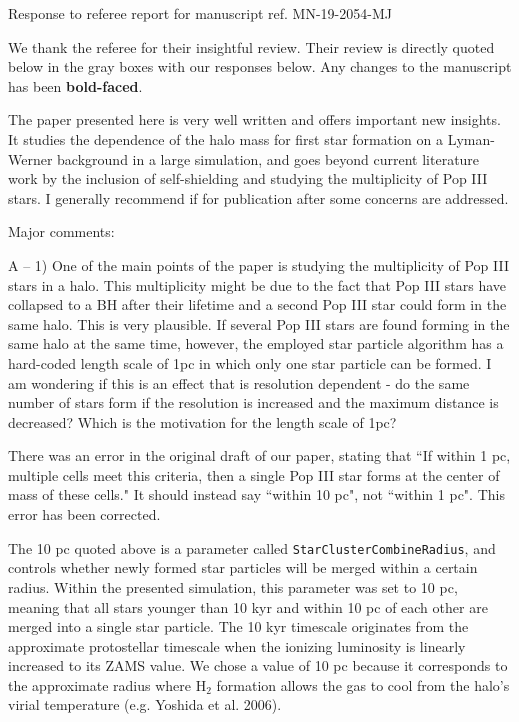 \documentclass[11pt]{article}
\newenvironment{referee}[1][]{%
    \ignorespaces%
    \begin{mdframed}[style=myquotestyle,#1]%
}{%
    \end{mdframed}%
    \ignorespacesafterend%
}%
\begin{document}
\begin{center} 
\bfseries{
\begin{large}
  Response to referee report for manuscript ref. MN-19-2054-MJ
\end{large}
}
\end{center}

We thank the referee for their insightful review.  Their review is directly quoted below in the gray boxes with our responses below.  Any changes to the manuscript has been \textbf{bold-faced}.

\begin{referee}
The paper presented here is very well written and offers important new insights.  It studies the dependence of the halo mass for first star formation on a Lyman-Werner background in a large simulation, and goes beyond current literature work by the inclusion of self-shielding and studying the multiplicity of Pop III stars. I generally recommend if for publication after some concerns are addressed.
\end{referee}


\begin{referee}
Major comments:

A -- 1) One of the main points of the paper is studying the multiplicity of Pop III stars in a halo. This multiplicity might be due to the fact that Pop III stars have collapsed to a BH after their lifetime and a second Pop III star could form in the same halo. This is very plausible. If several Pop III stars are found forming in the same halo at the same time, however, the employed star particle algorithm has a hard-coded length scale of 1pc in which only one star particle can be formed. I am wondering if this is an effect that is resolution dependent - do the same number of stars form if the resolution is increased and the maximum distance is decreased? Which is the motivation for the length scale of 1pc?
\end{referee}

There was an error in the original draft of our paper, stating that ``If within 1 pc, multiple cells meet this criteria, then a single Pop III star forms at the center of mass of these cells." It should instead say ``within 10 pc", not ``within 1 pc". This error has been corrected.

The 10 pc quoted above is a parameter called \texttt{StarClusterCombineRadius}, and controls whether newly formed star particles will be merged within a certain radius. Within the presented simulation, this parameter was set to 10 pc, meaning that all stars younger than 10 kyr and within 10 pc of each other are merged into a single star particle.  The 10 kyr timescale originates from the approximate protostellar timescale when the ionizing luminosity is linearly increased to its ZAMS value. We chose a value of 10 pc because it corresponds to the approximate radius where H$_2$ formation allows the gas to cool from the halo's virial temperature (e.g. Yoshida et al. 2006).
\end{document}
